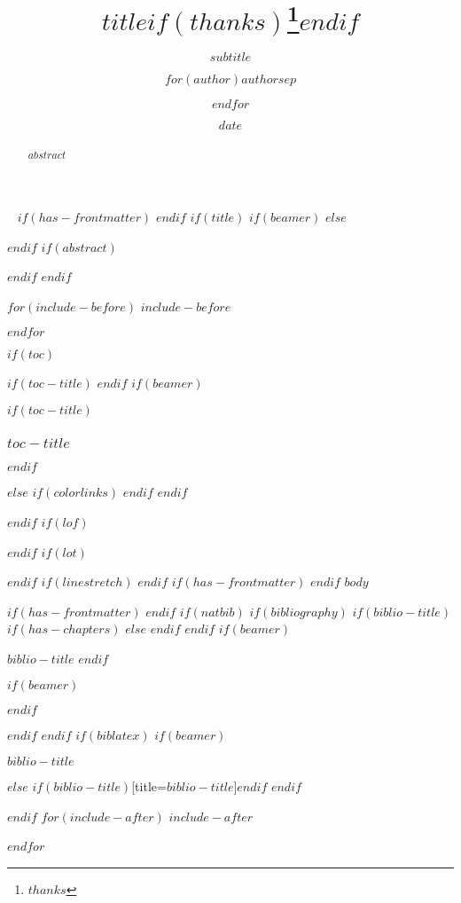 \documentclass[
$if(fontsize)$
  $fontsize$,
$endif$
$if(papersize)$
  $papersize$paper,
$endif$
$if(beamer)$
  ignorenonframetext,
$if(handout)$
  handout,
$endif$
$if(aspectratio)$
  aspectratio=$aspectratio$,
$endif$
$endif$
$for(classoption)$
  $classoption$$sep$,
$endfor$
]{$documentclass$}
\title{$title$$if(thanks)$\thanks{$thanks$}$endif$}
\subtitle{$subtitle$}
\author{$for(author)$$author$$sep$ \and $endfor$}
\date{$date$}
\institute{$for(institute)$$institute$$sep$ \and $endfor$}
\newif\ifbibliography
\begin{document}
\newpage~\thispagestyle{empty}\cleardoublepage
$if(has-frontmatter)$
\frontmatter
$endif$
$if(title)$
$if(beamer)$
\frame{\titlepage}
$else$
\maketitle
$endif$
$if(abstract)$
\begin{abstract}
$abstract$
\end{abstract}
$endif$
$endif$

$for(include-before)$
$include-before$

$endfor$

%

$if(toc)$
\begin{small}
$if(toc-title)$
\renewcommand*\contentsname{$toc-title$}
$endif$
$if(beamer)$
\begin{frame}[allowframebreaks]
$if(toc-title)$
  \frametitle{$toc-title$}
$endif$
  \tableofcontents[hideallsubsections]
\end{frame}
$else$
{
$if(colorlinks)$
\hypersetup{linkcolor=$if(toccolor)$$toccolor$$else$$endif$}
$endif$
\setcounter{tocdepth}{$toc-depth$}
\tableofcontents
}
$endif$
\end{small}
$endif$
$if(lof)$
\listoffigures
$endif$
$if(lot)$
\listoftables
$endif$
$if(linestretch)$
$endif$
$if(has-frontmatter)$
\mainmatter
$endif$
$body$

$if(has-frontmatter)$
\backmatter
$endif$
$if(natbib)$
$if(bibliography)$
$if(biblio-title)$
$if(has-chapters)$
\renewcommand\bibname{$biblio-title$}
$else$
\renewcommand\refname{$biblio-title$}
$endif$
$endif$
$if(beamer)$
\begin{frame}[allowframebreaks]{$biblio-title$}
  \bibliographytrue
$endif$
  
$if(beamer)$
\end{frame}
$endif$

$endif$
$endif$
$if(biblatex)$
$if(beamer)$
\begin{frame}[allowframebreaks]{$biblio-title$}
  \bibliographytrue
  \printbibliography[heading=none]
\end{frame}
$else$
\printbibliography$if(biblio-title)$[title=$biblio-title$]$endif$
$endif$

$endif$
$for(include-after)$
$include-after$

$endfor$
\newpage~\thispagestyle{empty}\cleardoublepage
\end{document}

